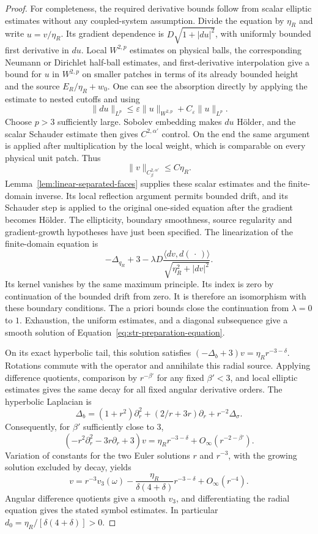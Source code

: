 \begin{proof}
For completeness, the required derivative bounds follow from scalar
elliptic estimates without any coupled-system assumption. Divide the
equation by $\eta_R$ and write $u=v/\eta_R$. Its gradient dependence is
$D\sqrt{1+|du|^2}$, with uniformly bounded first derivative in $du$.
Local $W^{2,p}$ estimates on physical balls, the corresponding Neumann
or Dirichlet half-ball estimates, and first-derivative interpolation
give a bound for $u$ in $W^{2,p}$ on smaller patches in terms of its
already bounded height and the source $E_R/\eta_R+w_0$. One can see the
absorption directly by applying the estimate to nested cutoffs and
using
\[
 \|du\|_{L^p}\leq\varepsilon\|u\|_{W^{2,p}}
                       +C_\varepsilon\|u\|_{L^p}.
\]
Choose $p>3$ sufficiently large. Sobolev embedding makes $du$ H\"older,
and the scalar Schauder estimate then gives $C^{2,\alpha'}$ control.
On the end the same argument is applied after multiplication by the
local weight, which is comparable on every physical unit patch.
Thus
\begin{equation}
 \|v\|_{C^{2,\alpha'}_\beta}\leq C\eta_R.
 \label{eq:str-v-estimate}
\end{equation}
Lemma~\ref{lem:linear-separated-faces} supplies these scalar estimates
and the finite-domain inverse. Its local reflection argument permits
bounded drift, and its Schauder step is applied to the original
one-sided equation after the gradient becomes H\"older.
The ellipticity, boundary smoothness, source regularity and
gradient-growth hypotheses have just been specified. The linearization of the finite-domain equation is
\[
 -\Delta_{q_R}+3-
 \lambda D\frac{\langle dv,d(\,\cdot\,)\rangle}
                    {\sqrt{\eta_R^2+|dv|^2}}.
\]
Its kernel vanishes by the same maximum principle. Its index is zero
by continuation of the bounded drift from zero. It is therefore an
isomorphism with these boundary conditions. The a priori bounds close
the continuation from $\lambda=0$ to $1$. Exhaustion, the uniform
estimates, and a diagonal subsequence give a smooth solution of
Equation~\eqref{eq:str-preparation-equation}.

On its exact hyperbolic tail, this solution satisfies
$(-\Delta_b+3)v=\eta_Rr^{-3-\delta}$. Rotations commute with the
operator and annihilate this radial source. Applying difference
quotients, comparison by $r^{-\beta'}$ for any fixed $\beta'<3$, and
local elliptic estimates gives the same decay for all fixed angular
derivative orders. The hyperbolic Laplacian is
\[
 \Delta_b=(1+r^2)\partial_r^2+(2/r+3r)\partial_r
                         +r^{-2}\Delta_\sigma.
\]
Consequently, for $\beta'$ sufficiently close to $3$,
\[
 (-r^2\partial_r^2-3r\partial_r+3)v
 =\eta_Rr^{-3-\delta}+O_\infty(r^{-2-\beta'}).
\]
Variation of constants for the two Euler solutions $r$ and $r^{-3}$,
with the growing solution excluded by decay, yields
\[
 v=r^{-3}v_3(\omega)
   -\frac{\eta_R}{\delta(4+\delta)}r^{-3-\delta}
   +O_\infty(r^{-4}).
\]
Angular difference quotients give a smooth $v_3$, and differentiating
the radial equation gives the stated symbol estimates. In particular
$d_0=\eta_R/[\delta(4+\delta)]>0$.


\end{proof}
